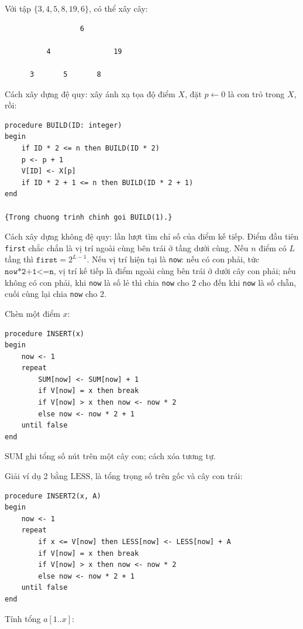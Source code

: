 \documentclass[11pt]{article}
\begin{document}
Với tập \(\{3,4,5,8,19,6\}\), có thể xây cây:

\begin{verbatim}
                  6

          4               19

      3       5       8
\end{verbatim}

Cách xây dựng đệ quy: xây ánh xạ tọa độ điểm \(X\), đặt \(p\leftarrow 0\) là
con trỏ trong \(X\), rồi:

\begin{verbatim}
procedure BUILD(ID: integer)
begin
    if ID * 2 <= n then BUILD(ID * 2)
    p <- p + 1
    V[ID] <- X[p]
    if ID * 2 + 1 <= n then BUILD(ID * 2 + 1)
end

{Trong chuong trinh chinh goi BUILD(1).}
\end{verbatim}

Cách xây dựng không đệ quy: lần lượt tìm chỉ số của điểm kế tiếp. Điểm đầu
tiên \texttt{first} chắc chắn là vị trí ngoài cùng bên trái ở tầng dưới cùng.
Nếu \(n\) điểm có \(L\) tầng thì \(\texttt{first}=2^{L-1}\). Nếu vị trí hiện
tại là \texttt{now}: nếu có con phải, tức \(\texttt{now*2+1<=n}\), vị trí kế
tiếp là điểm ngoài cùng bên trái ở dưới cây con phải; nếu không có con phải,
khi \texttt{now} là số lẻ thì chia \texttt{now} cho \(2\) cho đến khi
\texttt{now} là số chẵn, cuối cùng lại chia \texttt{now} cho \(2\).

Chèn một điểm \(x\):

\begin{verbatim}
procedure INSERT(x)
begin
    now <- 1
    repeat
        SUM[now] <- SUM[now] + 1
        if V[now] = x then break
        if V[now] > x then now <- now * 2
        else now <- now * 2 + 1
    until false
end
\end{verbatim}

\(\mathrm{SUM}\) ghi tổng số nút trên một cây con; cách xóa tương tự.

Giải ví dụ 2 bằng \(\mathrm{LESS}\), là tổng trọng số trên gốc và cây con trái:

\begin{verbatim}
procedure INSERT2(x, A)
begin
    now <- 1
    repeat
        if x <= V[now] then LESS[now] <- LESS[now] + A
        if V[now] = x then break
        if V[now] > x then now <- now * 2
        else now <- now * 2 + 1
    until false
end
\end{verbatim}

Tính tổng \(a[1..x]\):
\end{document}
